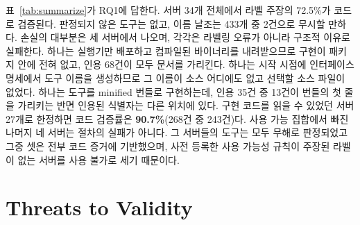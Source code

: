 \documentclass[acmsmall,screen,review,anonymous]{acmart}
\begin{document}
표~\ref{tab:summarize}가 RQ1에 답한다. 서버 34개 전체에서 라벨 주장의 72.5\%가 코드로 검증된다. 판정되지 않은 도구는 없고, 이름 날조는 433개 중 2건으로 무시할 만하다. 손실의 대부분은 세 서버에서 나오며, 각각은 라벨링 오류가 아니라 구조적 이유로 실패한다. 하나는 실행기만 배포하고 컴파일된 바이너리를 내려받으므로 구현이 패키지 안에 전혀 없고, 인용 68건이 모두 문서를 가리킨다. 하나는 시작 시점에 인터페이스 명세에서 도구 이름을 생성하므로 그 이름이 소스 어디에도 없고 선택할 소스 파일이 없었다. 하나는 도구를 minified 번들로 구현하는데, 인용 35건 중 13건이 번들의 첫 줄을 가리키는 반면 인용된 식별자는 다른 위치에 있다. 구현 코드를 읽을 수 있었던 서버 27개로 한정하면 코드 검증률은 \textbf{90.7\%}(268건 중 243건)다. 사용 가능 집합에서 빠진 나머지 네 서버는 절차의 실패가 아니다. 그 서버들의 도구는 모두 무해로 판정되었고 그중 셋은 전부 코드 증거에 기반했으며, 사전 등록한 사용 가능성 규칙이 주장된 라벨이 없는 서버를 사용 불가로 세기 때문이다.


\section{Threats to Validity}
\label{sec:threats}
\end{document}
